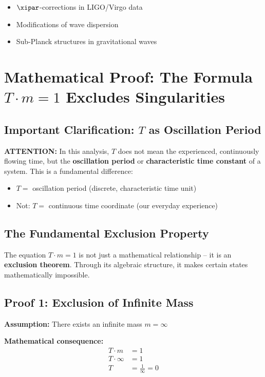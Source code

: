 	\begin{itemize}
		\item $\xipar$-corrections in LIGO/Virgo data
		\item Modifications of wave dispersion
		\item Sub-Planck structures in gravitational waves
	\end{itemize}
	
	\section{Mathematical Proof: The Formula $T \cdot m = 1$ Excludes Singularities}
	
	\subsection{Important Clarification: $T$ as Oscillation Period}
	
	\textbf{ATTENTION:} In this analysis, $T$ does not mean the experienced, continuously flowing time, but the \textbf{oscillation period} or \textbf{characteristic time constant} of a system. This is a fundamental difference:
	
	\begin{itemize}
		\item $T =$ oscillation period (discrete, characteristic time unit)
		\item Not: $T =$ continuous time coordinate (our everyday experience)
	\end{itemize}
	
	\subsection{The Fundamental Exclusion Property}
	
	The equation $T \cdot m = 1$ is not just a mathematical relationship -- it is an \textbf{exclusion theorem}. Through its algebraic structure, it makes certain states mathematically impossible.
	
	\subsection{Proof 1: Exclusion of Infinite Mass}
	
	\textbf{Assumption:} There exists an infinite mass $m = \infty$
	
	\textbf{Mathematical consequence:}
	\begin{align}
		T \cdot m &= 1\\
		T \cdot \infty &= 1\\
		T &= \frac{1}{\infty} = 0
	\end{align}
	
